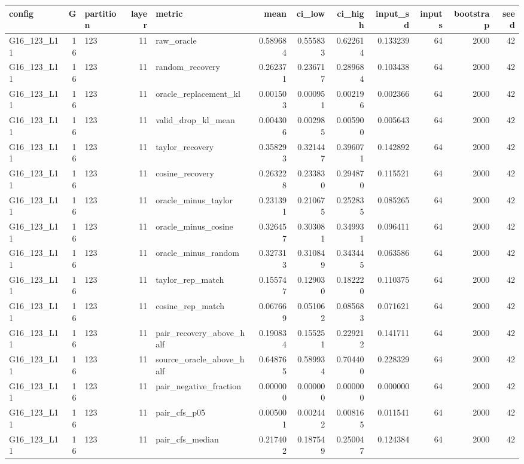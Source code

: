 \begin{tabular}{lrlrlrrrrrrr}
\toprule
config & G & partition & layer & metric & mean & ci_low & ci_high & input_sd & inputs & bootstrap & seed \\
\midrule
G16_123_L11 & 16 & 123 & 11 & raw_oracle & 0.589684 & 0.555833 & 0.622614 & 0.133239 & 64 & 2000 & 42 \\
G16_123_L11 & 16 & 123 & 11 & random_recovery & 0.262371 & 0.236717 & 0.289684 & 0.103438 & 64 & 2000 & 42 \\
G16_123_L11 & 16 & 123 & 11 & oracle_replacement_kl & 0.001503 & 0.000951 & 0.002196 & 0.002366 & 64 & 2000 & 42 \\
G16_123_L11 & 16 & 123 & 11 & valid_drop_kl_mean & 0.004306 & 0.002985 & 0.005900 & 0.005643 & 64 & 2000 & 42 \\
G16_123_L11 & 16 & 123 & 11 & taylor_recovery & 0.358293 & 0.321447 & 0.396071 & 0.142892 & 64 & 2000 & 42 \\
G16_123_L11 & 16 & 123 & 11 & cosine_recovery & 0.263228 & 0.233830 & 0.294870 & 0.115521 & 64 & 2000 & 42 \\
G16_123_L11 & 16 & 123 & 11 & oracle_minus_taylor & 0.231391 & 0.210675 & 0.252835 & 0.085265 & 64 & 2000 & 42 \\
G16_123_L11 & 16 & 123 & 11 & oracle_minus_cosine & 0.326457 & 0.303081 & 0.349931 & 0.096411 & 64 & 2000 & 42 \\
G16_123_L11 & 16 & 123 & 11 & oracle_minus_random & 0.327313 & 0.310849 & 0.343445 & 0.063586 & 64 & 2000 & 42 \\
G16_123_L11 & 16 & 123 & 11 & taylor_rep_match & 0.155747 & 0.129030 & 0.182220 & 0.110375 & 64 & 2000 & 42 \\
G16_123_L11 & 16 & 123 & 11 & cosine_rep_match & 0.067669 & 0.051062 & 0.085683 & 0.071621 & 64 & 2000 & 42 \\
G16_123_L11 & 16 & 123 & 11 & pair_recovery_above_half & 0.190834 & 0.155251 & 0.229212 & 0.141711 & 64 & 2000 & 42 \\
G16_123_L11 & 16 & 123 & 11 & source_oracle_above_half & 0.648765 & 0.589934 & 0.704400 & 0.228329 & 64 & 2000 & 42 \\
G16_123_L11 & 16 & 123 & 11 & pair_negative_fraction & 0.000000 & 0.000000 & 0.000000 & 0.000000 & 64 & 2000 & 42 \\
G16_123_L11 & 16 & 123 & 11 & pair_cfs_p05 & 0.005001 & 0.002442 & 0.008165 & 0.011541 & 64 & 2000 & 42 \\
G16_123_L11 & 16 & 123 & 11 & pair_cfs_median & 0.217402 & 0.187549 & 0.250047 & 0.124384 & 64 & 2000 & 42 \\

\end{tabular}
